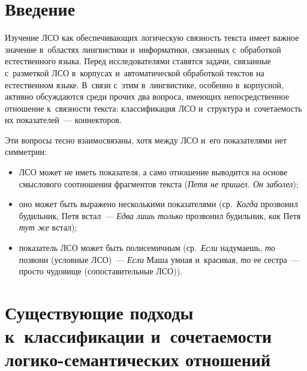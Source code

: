 
  
\vspace*{-4pt}



\thispagestyle{headings}

\begin{multicols}{2}

\label{st\stat}

\section{Введение}

  Изучение ЛСО как 
обеспечивающих логическую связность текста имеет важное значение 
в~областях лингвистики и~информатики, связанных с~обработкой 
естественного языка. Перед исследователями ставятся задачи, связанные 
с~разметкой ЛСО в~корпусах и~автоматической обработкой текстов на 
естественном языке. В~связи с~этим в~лингвистике, особенно в~корпусной, 
активно обсуждаются среди прочих два вопроса, имеющих непосредственное 
отношение к~связности текста: классификация 
ЛСО и~структура и~сочетаемость их показателей~--- коннекторов.
  
  Эти вопросы тесно взаимосвязаны, хотя между ЛСО и~его показателями нет 
симметрии:
  \begin{itemize}
\item ЛСО может не иметь показателя, а само отношение выводится на 
основе смыслового соотношения фрагментов текста (\textit{Петя не пришел. 
Он заболел});
\item оно может быть выражено несколькими показателями (ср.\ 
\textit{Когда} прозвонил будильник, Петя встал~--- \textit{Едва лишь 
только} прозвонил будильник, \textit{как} Петя \textit{тут же} встал);
\item показатель ЛСО может быть полисемичным (ср.\ \textit{Если} 
надумаешь, \textit{то} позвони (условные ЛСО)~--- \textit{Если} Маша 
умная и~красивая, \textit{то} ее сестра~--- просто чудовище 
(сопоставительные ЛСО)).
\end{itemize}

\vspace*{-3pt}

\section{Существующие подходы к~классификации 
и~сочетаемости логико-семантических отношений}


\end{multicols}

